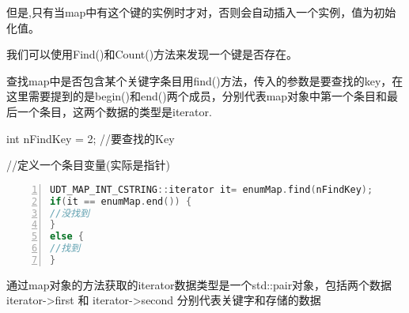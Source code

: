 \documentclass[11pt,a4paper,titlepage]{article}
\begin{document}
但是,只有当map中有这个键的实例时才对，否则会自动插入一个实例，值为初始化值。

我们可以使用Find()和Count()方法来发现一个键是否存在。

查找map中是否包含某个关键字条目用find()方法，传入的参数是要查找的key，在这里需要提到的是begin()和end()两个成员，分别代表map对象中第一个条目和最后一个条目，这两个数据的类型是iterator.

int nFindKey = 2; //要查找的Key

//定义一个条目变量(实际是指针)
\begin{lstlisting}[language=C++, numbers=left]
UDT_MAP_INT_CSTRING::iterator it= enumMap.find(nFindKey);
if(it == enumMap.end()) {
//没找到
}
else {
//找到
}
\end{lstlisting}
通过map对象的方法获取的iterator数据类型是一个std::pair对象，包括两个数据 iterator->first 和 iterator->second 分别代表关键字和存储的数据
\end{document}
